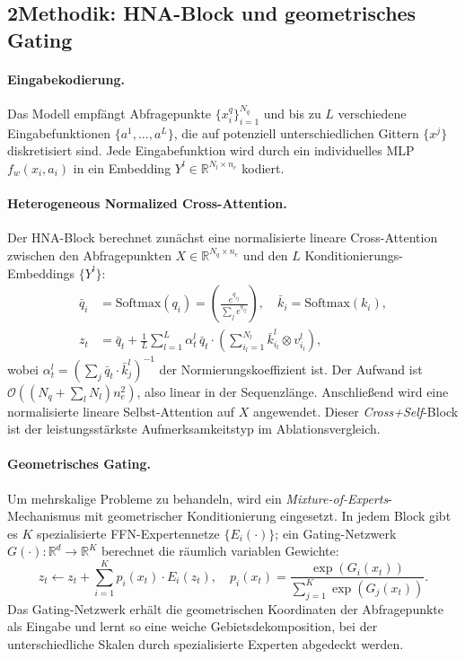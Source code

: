 \documentclass[a4paper,12pt]{article}
\begin{document}
\subsection*{2\quad Methodik: HNA-Block und geometrisches Gating}

\paragraph{Eingabekodierung.}
Das Modell empfängt Abfragepunkte $\{x_i^q\}_{i=1}^{N_q}$ und bis zu $L$ verschiedene
Eingabefunktionen $\{a^1, \ldots, a^L\}$, die auf potenziell unterschiedlichen Gittern
$\{x^{j}\}$ diskretisiert sind. Jede Eingabefunktion wird durch ein individuelles
MLP $f_w(x_i, a_i)$ in ein Embedding $Y^l \in \mathbb{R}^{N_l \times n_e}$ kodiert.

\paragraph{Heterogeneous Normalized Cross-Attention.}
Der HNA-Block berechnet zunächst eine normalisierte lineare Cross-Attention zwischen
den Abfragepunkten $X \in \mathbb{R}^{N_q \times n_e}$ und den $L$ Konditionierungs-Embeddings
$\{Y^l\}$:
\begin{align}
    \bar{q}_i &= \mathrm{Softmax}(q_i) = \left(\frac{e^{q_{ij}}}{\sum_j e^{q_{ij}}}\right),\quad
    \bar{k}_i = \mathrm{Softmax}(k_i), \\
    z_t &= \bar{q}_t + \frac{1}{L} \sum_{l=1}^{L} \alpha_t^l\,\bar{q}_t \cdot
           \left(\sum_{i_l=1}^{N_l} \bar{k}_{i_l}^l \otimes v_{i_l}^l\right),
\end{align}
wobei $\alpha_t^l = \left(\sum_j \bar{q}_t \cdot \bar{k}_j^l\right)^{-1}$ der
Normierungskoeffizient ist. Der Aufwand ist $\mathcal{O}((N_q + \sum_l N_l) n_e^2)$,
also linear in der Sequenzlänge. Anschließend wird eine normalisierte lineare
Selbst-Attention auf $X$ angewendet. Dieser \emph{Cross+Self}-Block ist der
leistungsstärkste Aufmerksamkeitstyp im Ablationsvergleich.

\paragraph{Geometrisches Gating.}
Um mehrskalige Probleme zu behandeln, wird ein \emph{Mixture-of-Experts}-Mechanismus
mit geometrischer Konditionierung eingesetzt. In jedem Block gibt es $K$ spezialisierte
FFN-Expertennetze $\{E_i(\cdot)\}$; ein Gating-Netzwerk $G(\cdot) : \mathbb{R}^d \to \mathbb{R}^K$
berechnet die räumlich variablen Gewichte:
\begin{equation}
    z_t \leftarrow z_t + \sum_{i=1}^{K} p_i(x_t) \cdot E_i(z_t), \quad
    p_i(x_t) = \frac{\exp(G_i(x_t))}{\sum_{j=1}^K \exp(G_j(x_t))}.
\end{equation}
Das Gating-Netzwerk erhält die geometrischen Koordinaten der Abfragepunkte als Eingabe
und lernt so eine weiche Gebietsdekomposition, bei der unterschiedliche Skalen
durch spezialisierte Experten abgedeckt werden.
\end{document}
